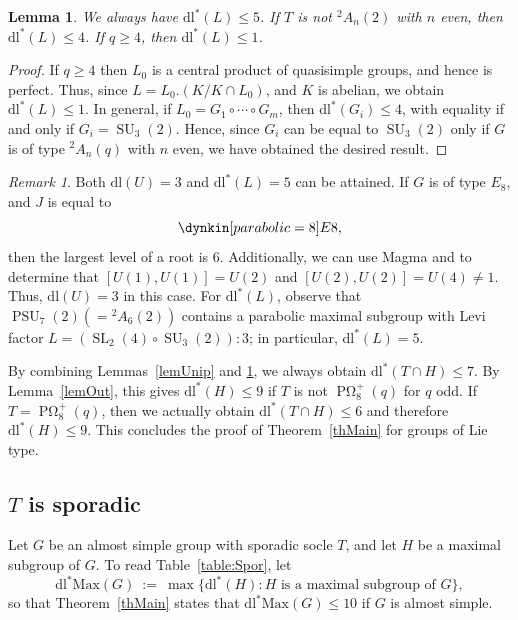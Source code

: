 \documentclass[11pt]{amsart}
\numberwithin{equation}{section}
\newtheorem{lemma}[theorem]{Lemma}
\theoremstyle{definition}
\theoremstyle{remark}
\newtheorem{remark}[theorem]{Remark}
\DeclareMathOperator{\SL}{SL}
\newcommand{\PSU}{\mathop{\mathrm{PSU}}}
\newcommand{\dll}{\mathrm{dl^*}}
\newcommand{\dl}{\mathrm{dl}}
\newcommand{\dllMax}{\mathrm{dl^*Max}}
\DeclareMathOperator{\SU}{SU}
\DeclareMathOperator{\POmega}{P \Omega}
\begin{document}
\begin{lemma} \label{lemLevi}
We always have $\dll(L) \leq 5$.
If $T$ is not ${}^2A_n(2)$ with $n$ even, then $\dll(L) \leq 4$.
If $q \geq 4$, then $\dll(L) \leq 1$.
\end{lemma}
\begin{proof}
If $q \geq 4$ then $L_0$ is a central product of quasisimple groups, and hence is perfect. Thus, since $L = L_0 . (K/K \cap L_0)$, and $K$ is abelian, we obtain $\dll(L) \leq 1$.
In general, if $L_0 = G_1 \circ \cdots \circ G_m$, then $\dll(G_i) \leq 4$, with equality if and only if $G_i = \SU_3(2)$. Hence, since $G_i$ can be equal to $\SU_3(2)$ only if $G$ is of type ${}^2A_n(q)$ with $n$ even, we have obtained the desired result.
\end{proof} 

\begin{remark}
Both $\dl(U)=3$ and $\dll(L)=5$ can be attained.
If $G$ is of type $E_8$, and $J$ is equal to
\[
    \dynkin [parabolic=8] E8 ,
\]
then the largest level of a root is 6. Additionally, we can use Magma \cite{magma} and \cite[Th.~5.2.2]{Car72} to determine that $[U(1), U(1)] = U(2)$ and $[U(2), U(2)] = U(4) \neq 1$.
Thus, $\dl(U) = 3$ in this case.
For $\dll(L)$, observe that $\PSU_7(2) (= {}^2A_6(2))$ contains a parabolic maximal subgroup with Levi factor $L=(\SL_2(4) \circ \SU_3(2)):3$; in particular, $\dll(L) = 5$.
\end{remark}

By combining Lemmas~\ref{lemUnip} and \ref{lemLevi}, we always obtain $\dll(T \cap H) \leq 7$. By Lemma~\ref{lemOut}, this gives $\dll(H) \leq 9$ if $T$ is not $\POmega_8^+(q)$ for $q$ odd.
If $T=\POmega_8^+(q)$, then we actually obtain $\dll(T \cap H) \leq 6$ and therefore $\dll(H) \leq 9$.
This concludes the proof of Theorem~\ref{thMain} for groups of Lie type.










\subsection{$T$ is sporadic}

Let $G$ be an almost simple group with sporadic socle $T$, and let $H$ be a maximal subgroup of $G$.
To read Table~\ref{table:Spor}, let
$$ \dllMax(G) \> := \> \max \{ \dll(H) : H \mbox{ is a maximal subgroup of } G \} , $$
so that Theorem~\ref{thMain} states that $\dllMax(G) \leq 10$ if $G$ is almost simple.
\end{document}
